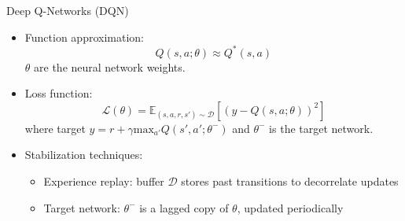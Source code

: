 \documentclass[10pt]{beamer}
\renewcommand{\max}{\text{max}}
\begin{document}
\begin{frame}{Deep Q-Networks (DQN)}
    \begin{itemize}
        \item Function approximation:
        \begin{equation}
            Q(s,a;\theta) \approx Q^*(s,a)
        \end{equation}
        $\theta$ are the neural network weights.

        \item Loss function:
        \begin{equation}
            \mathcal{L}(\theta) = \mathbb{E}_{(s,a,r,s') \sim \mathcal{D}} \left[ \left( y - Q(s,a;\theta) \right)^2 \right]
        \end{equation}
        where target $y = r + \gamma \max_{a'} Q(s', a'; \theta^-)$ and $\theta^-$ is the target network.

        \item Stabilization techniques:
        \begin{itemize}
            \item Experience replay: buffer $\mathcal{D}$ stores past transitions to decorrelate updates
            \item Target network: $\theta^-$ is a lagged copy of $\theta$, updated periodically
        \end{itemize}
    \end{itemize}
\end{frame}


\end{document}
